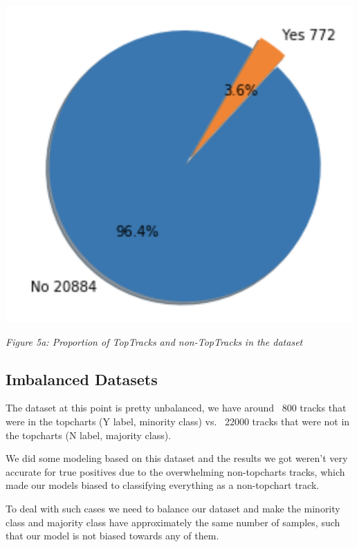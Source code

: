 \documentclass[12pt,journal]{IEEEtran}
\begin{document}
\begin{center}
	\includegraphics[width=.8\linewidth]{p1}
	
	\textit{Figure 5a: Proportion of TopTracks and non-TopTracks in the dataset}
\end{center}

\subsection{Imbalanced Datasets}
The dataset at this point is pretty unbalanced, we have around ~800 tracks that were in the topcharts (Y label, minority class) vs. ~22000 tracks that were not in the topcharts (N label, majority class). 

We did some modeling based on this dataset and the results we got weren’t very accurate for true positives due to the overwhelming non-topcharts tracks, which made our models biased to classifying everything as a non-topchart track.

To deal with such cases we need to balance our dataset  and make the minority class and majority class have approximately the same number of samples, such that our model is not biased towards any of them.
\end{document}
